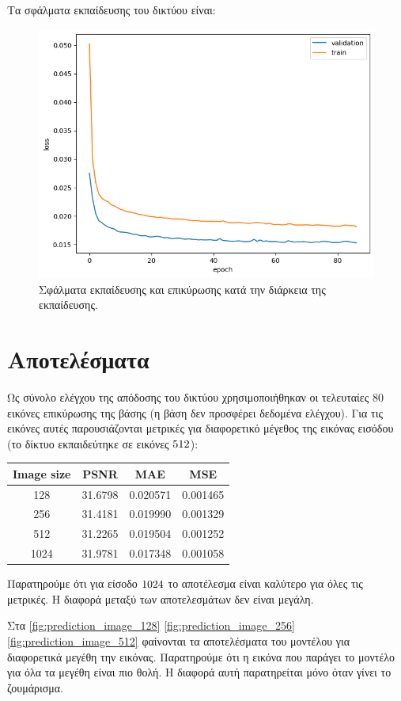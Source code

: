 \documentclass[a4paper]{article}
\begin{document}
Τα σφάλματα εκπαίδευσης του δικτύου είναι:

\begin{figure}[H]
    \centering

    \includegraphics[width=.5\linewidth]{SRTransformer6_losses.png}

    \caption{Σφάλματα εκπαίδευσης και επικύρωσης κατά την διάρκεια της
    εκπαίδευσης.}
\end{figure}

\section{Αποτελέσματα}

Ως σύνολο ελέγχου της απόδοσης του δικτύου χρησιμοποιήθηκαν οι τελευταίες 80
εικόνες επικύρωσης της βάσης (η βάση δεν προσφέρει δεδομένα ελέγχου). Για τις
εικόνες αυτές παρουσιάζονται μετρικές για διαφορετικό μέγεθος της εικόνας
εισόδου (το δίκτυο εκπαιδεύτηκε σε εικόνες $512\time512$):

\begin{center}
\begin{tabular}{|c|c|c|c|}
\hline
\textbf{Image size} & \textbf{PSNR} & \textbf{MAE} & \textbf{MSE} \\
\hline
128  & 31.6798 & 0.020571 & 0.001465 \\ \hline
256  & 31.4181 & 0.019990 & 0.001329 \\ \hline
512  & 31.2265 & 0.019504 & 0.001252 \\ \hline
1024 & 31.9781 & 0.017348 & 0.001058 \\ \hline
\end{tabular}
\end{center}

Παρατηρούμε ότι για είσοδο $1024\time1024$ το αποτέλεσμα είναι καλύτερο για όλες
τις μετρικές. Η διαφορά μεταξύ των αποτελεσμάτων δεν είναι μεγάλη.

Στα \autoref{fig:prediction_image_128} \autoref{fig:prediction_image_256}
\autoref{fig:prediction_image_512} φαίνονται τα αποτελέσματα του μοντέλου για
διαφορετικά μεγέθη την εικόνας. Παρατηρούμε ότι η εικόνα που παράγει το
μοντέλο για όλα τα μεγέθη είναι πιο θολή. Η διαφορά αυτή παρατηρείται μόνο όταν
γίνει το ζουμάρισμα.
\end{document}
